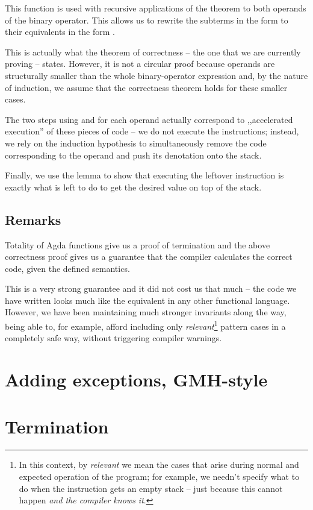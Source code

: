 \noindent This function is used with recursive applications of the theorem
 to both operands of the binary operator. This allows us
to rewrite the subterms in the form 
to their equivalents in the form .

This is actually what the theorem of correctness -- the one that we are
currently proving -- states. However, it is not a circular proof because
operands are structurally smaller than the whole binary-operator expression
and, by the nature of induction, we assume that the correctness theorem holds
for these smaller cases.

The two steps using  and  for each operand
actually correspond to ,,accelerated execution'' of these pieces of code -- we
do not execute the instructions; instead, we rely on the induction hypothesis
to simultaneously remove the code corresponding to the operand and push its
denotation onto the stack.

Finally, we use the lemma  to show that executing the
leftover instruction is exactly what is left to do to get the desired value
on top of the stack.

\subsection{Remarks}

Totality of Agda functions give us a proof of termination and the above
correctness proof gives us a guarantee that the compiler calculates the correct
code, given the defined semantics.

This is a very strong guarantee and it did not cost us that much -- the code we
have written looks much like the equivalent in any other functional language.
However, we have been maintaining much stronger invariants along the way, being
able to, for example, afford including only \emph{relevant}\footnote{In this
  context, by \emph{relevant} we mean the cases that arise during normal and
  expected operation of the program; for example, we needn't specify what to do
when the instruction  gets an empty stack -- just because this
cannot happen \emph{and the compiler knows it}.} pattern cases in a completely
safe way, without triggering compiler warnings.

\section{Adding exceptions, GMH-style}

\section{Termination}
